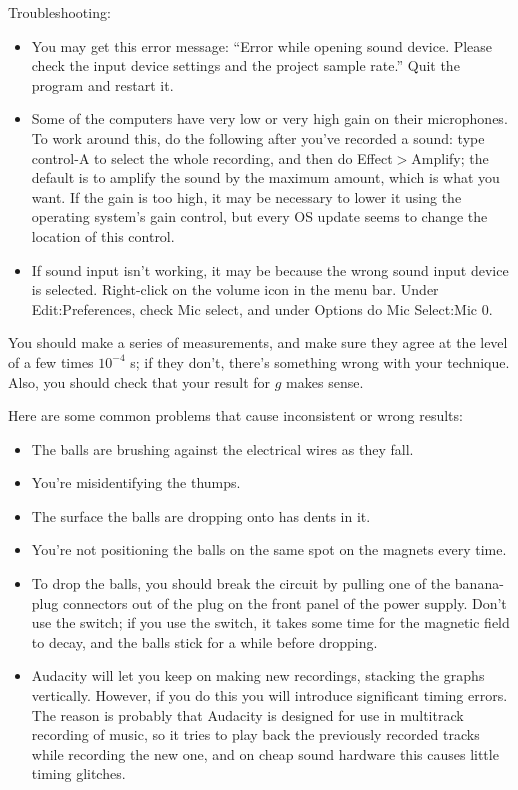 Troubleshooting:
\begin{itemize}
\item[] You may get this error message: ``Error while opening sound device. Please check the input device settings and the project sample rate.''
Quit the program and restart it.

\item[] Some of the computers have very low or very high gain on their microphones. To work around
this, do the following after you've recorded a sound: type control-A to select the whole recording,
and then do Effect$>$Amplify; the default is to amplify the sound by the maximum amount, which is what you want.
If the gain is too high, it may be necessary to lower it using the operating system's gain control, but
every OS update seems to change the location of this control.

\item[] If sound input isn't working, it may be because the wrong sound input device is selected. Right-click on the volume icon
in the menu bar. Under Edit:Preferences, check Mic select, and under Options do Mic Select:Mic 0.
\end{itemize}

You should make a series of measurements, and
make sure they agree at the level of a few times $10^{-4}$ s; if they
don't, there's something wrong with your technique. Also, you
should check that your result for $g$ makes sense.

Here are some common problems that cause inconsistent or wrong results:
\begin{itemize}
\item[] The balls are brushing against the electrical wires as they fall.
\item[] You're misidentifying the thumps.
\item[] The surface the balls are dropping onto has dents in it. 
\item[] You're not positioning the balls on the same spot on the magnets every time.
\item[] To drop the balls, you should break the circuit by pulling one of the banana-plug connectors out of the plug on the front
panel of the power supply. Don't use the switch; if you use the switch, it takes some time for the magnetic field to decay, and the balls stick for a while before dropping. 
\item[] Audacity will let you keep on making new recordings, stacking the graphs
vertically. However, if you do this you will introduce significant timing
errors. The reason is probably that Audacity is designed for use in multitrack recording
of music, so it tries to play back the previously recorded tracks while recording the
new one, and on cheap sound hardware this causes little timing glitches.
\end{itemize}

